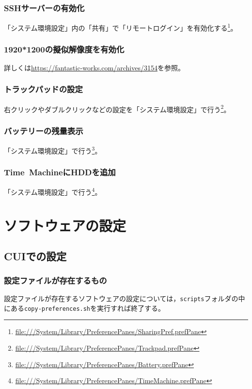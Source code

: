 \documentclass[b5j,titlepage]{ltjsarticle}
\begin{document}
			\subsubsection{SSHサーバーの有効化}
				「システム環境設定」内の「共有」で「リモートログイン」を有効化する\footnote{\protect\url{file:///System/Library/PreferencePanes/SharingPref.prefPane}}。

			\subsubsection{1920*1200の擬似解像度を有効化}
				詳しくは\protect\url{https://fantastic-works.com/archives/3154}を参照。

			\subsubsection{トラックパッドの設定}
				右クリックやダブルクリックなどの設定を「システム環境設定」で行う\footnote{\protect\url{file:///System/Library/PreferencePanes/Trackpad.prefPane}}。

			\subsubsection{バッテリーの残量表示}
				「システム環境設定」で行う\footnote{\protect\url{file:///System/Library/PreferencePanes/Battery.prefPane}}。

			\subsubsection{Time\ MachineにHDDを追加}
				「システム環境設定」で行う\footnote{\protect\url{file:///System/Library/PreferencePanes/TimeMachine.prefPane}}。

	\clearpage

	\section{ソフトウェアの設定}
		\subsection{CUIでの設定}
			\subsubsection{設定ファイルが存在するもの}
				設定ファイルが存在するソフトウェアの設定については，\texttt{scripts}フォルダの中にある\texttt{copy-preferences.sh}を実行すれば終了する。
\end{document}
